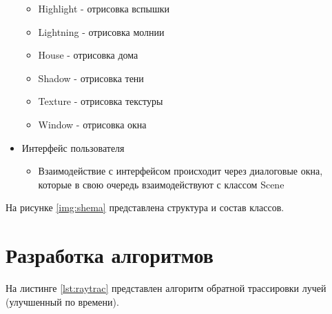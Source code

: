 \begin{itemize}
	\begin{itemize}
		\item Highlight - отрисовка вспышки
		\item Lightning - отрисовка молнии
		\item House - отрисовка дома
		\item Shadow - отрисовка тени
		\item Texture - отрисовка текстуры
		\item Window - отрисовка окна
	\end{itemize}
	\item Интерфейс пользователя
	\begin{itemize}
		\item Взаимодействие с интерфейсом происходит через диалоговые окна, которые в свою очередь взаимодействуют с классом Scene
	\end{itemize}	
\end{itemize}

На рисунке \ref{img:shema} представлена структура и состав классов.

\clearpage

\section{Разработка алгоритмов}
На листинге \ref{lst:raytrac} представлен алгоритм обратной трассировки лучей (улучшенный по времени).


